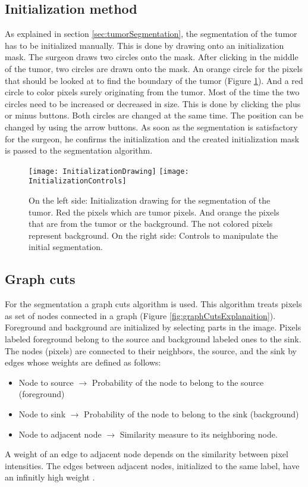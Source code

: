 \subsection{Initialization method}
As explained in section \ref{sec:tumorSegmentation}, the segmentation of the
tumor has to be initialized manually. This is done by drawing onto an
initialization mask. The surgeon draws two circles onto the mask. After clicking in the middle of the tumor, two
circles are drawn onto the mask. An orange
circle for the pixels that should be looked at to find the boundary of the
tumor (Figure \ref{fig:InitializeGraphCut}). And a red circle to color pixels surely
originating from the tumor. Most of the time the two circles need to be
increased or decreased in size. This is done by clicking the plus or minus
buttons. Both circles are changed at the same time. The position can be changed
by using the arrow buttons. As soon as the segmentation is satisfactory for the surgeon, he confirms the
initialization and the created initialization mask is passed to the segmentation algorithm.
\begin{figure}[H]
  \centering
  \texttt{[image: InitializationDrawing]}
  \endminipage
  \hfill
  \texttt{[image: InitializationControls]}
  \endminipage
  \hfill
  \caption{On the left side: Initialization drawing for the segmentation of the
    tumor. Red the pixels which are tumor pixels. And orange the pixels that are
    from the tumor or the background. The not colored pixels represent
    background. On the right side: Controls to manipulate the initial segmentation.}
  \label{fig:InitializeGraphCut}
\end{figure}

\subsection{Graph cuts}
For the segmentation a graph cuts algorithm is used. This algorithm treats
pixels as set of nodes connected in a graph (Figure
\ref{fig:graphCutsExplanaition}). Foreground and background are initialized by
selecting parts in the image.
Pixels labeled foreground belong to the source and
background labeled ones to the sink. The nodes (pixels) are connected to their
neighbors, the source, and the sink by
edges whose weights are defined as follows:
\begin{itemize}
  \item Node to source $\rightarrow$ Probability of the node to belong to the source (foreground)
  \item Node to sink $\rightarrow$ Probability of the node to belong to the sink (background)
  \item Node to adjacent node $\rightarrow$ Similarity measure to its neighboring node. 
\end{itemize}
A weight of an edge to adjacent node depends on the similarity between pixel intensities.
The edges between adjacent nodes, initialized to the same label, have an
infinitly high weight \cite{wiki:MaxFlow}.

